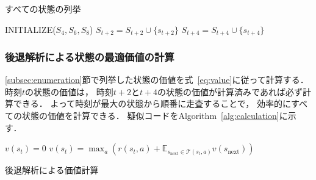 \begin{algorithm}[tb]
\caption{すべての状態の列挙}
\label{alg:bfs}
\begin{algorithmic}[1]
    \State INITIALIZE($S_4, S_6, S_8$)
                    \State $S_{t+2} = S_{t+2} \cup \{s_{t+2}\}$
                \EndIf
            \EndFor
                    \State $S_{t+4} = S_{t+4} \cup \{s_{t+4}\}$
                \EndIf
            \EndFor
        \EndFor
    \EndFor
\EndFunction
\end{algorithmic}
\end{algorithm}

\subsubsection{後退解析による状態の最適価値の計算}
\label{subsec:calculation}
\ref{subsec:enumeration}節で列挙した状態の価値を式~\ref{eq:value}に従って計算する．
時刻$t$の状態の価値は， 時刻$t+2$と$t+4$の状態の価値が計算済みであれば必ず計算できる．
よって時刻が最大の状態から順番に走査することで， 効率的にすべての状態の価値を計算できる．
疑似コードをAlgorithm~\ref{alg:calculation}に示す．
\begin{algorithm}[tb]
    \begin{algorithmic}[1]
                    \State $v(s_t) = 0$
                \Else {}
                    \State $v(s_t) = \max_a \left(r(s_t,a) + \mathbb{E}_{s_\text{next} \in \mathcal{T}(s_t,a)} v(s_\text{next}) \right)$
                \EndIf
            \EndFor
        \EndFor
    \EndFunction
    \end{algorithmic}
    \caption{後退解析による価値計算}
    \label{alg:calculation}
\end{algorithm}

